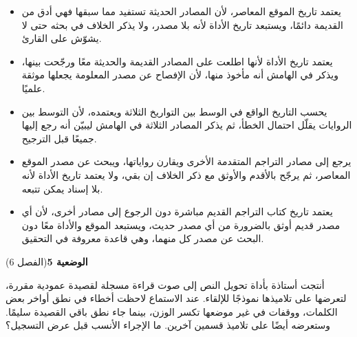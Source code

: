 \documentclass[11pt,a4paper]{article}
\begin{document}
\begin{itemize}[leftmargin=1.0cm, labelsep=6pt, itemsep=3pt, topsep=4pt, parsep=0pt]
  \item[\textbf{أ)}] يعتمد تاريخ الموقع المعاصر، لأن المصادر الحديثة تستفيد مما سبقها فهي أدق من القديمة دائمًا، ويستبعد تاريخ الأداة لأنه بلا مصدر، ولا يذكر الخلاف في بحثه حتى لا يشوّش على القارئ.
  \item[\textbf{ب)}] يعتمد تاريخ الأداة لأنها اطلعت على المصادر القديمة والحديثة معًا ورجّحت بينها، ويذكر في الهامش أنه مأخوذ منها، لأن الإفصاح عن مصدر المعلومة يجعلها موثقة علميًا.
  \item[\textbf{ج)}] يحسب التاريخ الواقع في الوسط بين التواريخ الثلاثة ويعتمده، لأن التوسط بين الروايات يقلّل احتمال الخطأ، ثم يذكر المصادر الثلاثة في الهامش ليبيّن أنه رجع إليها جميعًا قبل الترجيح.
  \item[\textbf{د)}] يرجع إلى مصادر التراجم المتقدمة الأخرى ويقارن رواياتها، ويبحث عن مصدر الموقع المعاصر، ثم يرجّح بالأقدم والأوثق مع ذكر الخلاف إن بقي، ولا يعتمد تاريخ الأداة لأنه بلا إسناد يمكن تتبعه.
  \item[\textbf{هـ)}] يعتمد تاريخ كتاب التراجم القديم مباشرة دون الرجوع إلى مصادر أخرى، لأن أي مصدر قديم أوثق بالضرورة من أي مصدر حديث، ويستبعد الموقع والأداة معًا دون البحث عن مصدر كل منهما، وهي قاعدة معروفة في التحقيق.
\end{itemize}
\par\vspace{6pt}
\noindent
{\large\khatt\textbf{الوضعية 5}}\hfill{\small(الفصل 6)}\par\nopagebreak\vspace{3pt}
\setlength{\fboxsep}{7pt}\colorbox{gray!10}{\parbox{\dimexpr\linewidth-14pt}{أنتجت أستاذة بأداة تحويل النص إلى صوت قراءة مسجلة لقصيدة عمودية مقررة، لتعرضها على تلاميذها نموذجًا للإلقاء. عند الاستماع لاحظت أخطاء في نطق أواخر بعض الكلمات، ووقفات في غير موضعها تكسر الوزن، بينما جاء نطق باقي القصيدة سليمًا. وستعرضه أيضًا على تلاميذ قسمين آخرين. ما الإجراء الأنسب قبل عرض التسجيل؟}}\par\nopagebreak
\end{document}
